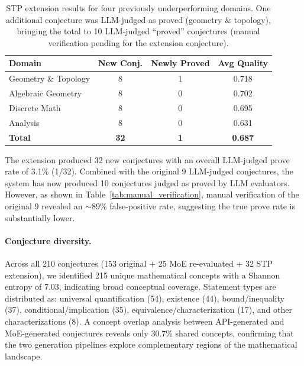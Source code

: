 \documentclass[11pt,a4paper]{article}
\begin{document}
\begin{table}[h]
\centering
\caption{STP extension results for four previously underperforming domains. One additional conjecture was LLM-judged as proved (geometry \& topology), bringing the total to 10 LLM-judged ``proved'' conjectures (manual verification pending for the extension conjecture).}
\label{tab:stp_extension}
\small
\begin{tabular}{@{}lccc@{}}
\toprule
\textbf{Domain} & \textbf{New Conj.} & \textbf{Newly Proved} & \textbf{Avg Quality} \\
\midrule
Geometry \& Topology & 8 & 1 & 0.718 \\
Algebraic Geometry   & 8 & 0 & 0.702 \\
Discrete Math        & 8 & 0 & 0.695 \\
Analysis             & 8 & 0 & 0.631 \\
\midrule
\textbf{Total}       & \textbf{32} & \textbf{1} & \textbf{0.687} \\
\bottomrule
\end{tabular}
\end{table}

The extension produced 32 new conjectures with an overall LLM-judged prove rate of 3.1\% (1/32). Combined with the original 9 LLM-judged conjectures, the system has now produced 10 conjectures judged as proved by LLM evaluators. However, as shown in Table~\ref{tab:manual_verification}, manual verification of the original 9 revealed an $\sim$89\% false-positive rate, suggesting the true prove rate is substantially lower.

\paragraph{Conjecture diversity.}
Across all 210 conjectures (153 original + 25 MoE re-evaluated + 32 STP extension), we identified 215 unique mathematical concepts with a Shannon entropy of 7.03, indicating broad conceptual coverage. Statement types are distributed as: universal quantification (54), existence (44), bound/inequality (37), conditional/implication (35), equivalence/characterization (17), and other characterizations (8). A concept overlap analysis between API-generated and MoE-generated conjectures reveals only 30.7\% shared concepts, confirming that the two generation pipelines explore complementary regions of the mathematical landscape.
\end{document}
